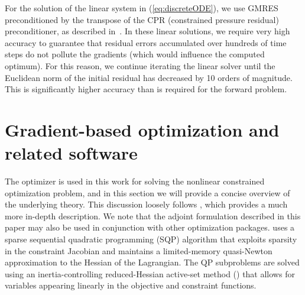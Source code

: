 For the solution of the linear system in (\ref{eq:discreteODE}), we use
GMRES preconditioned by the transpose of the CPR (constrained
pressure residual) preconditioner, as described in~\cite{CPRA}. In these
linear solutions, we require very high accuracy to guarantee that residual
errors accumulated over hundreds of time steps do not pollute the gradients
(which would influence the computed optimum). For this reason, we continue
iterating the linear solver until the Euclidean norm of the initial residual has
decreased by 10 orders of magnitude. This is significantly higher accuracy than
is required for the forward problem.




\section{Gradient-based optimization and related software}
\label{sec:SQPSNOPT}

The \SNOPT{} optimizer is used in this work for solving the nonlinear constrained
optimization problem, and in this section we will provide a concise overview of the underlying theory. This discussion loosely follows \cite{SNOPT}, which provides a much more in-depth description. We note that the adjoint formulation described in this paper may also be used in conjunction with other optimization packages. \SNOPT{} uses a sparse sequential quadratic
programming (SQP) algorithm that exploits sparsity in
the constraint Jacobian and maintains a limited-memory quasi-Newton
approximation to the Hessian of the Lagrangian. The QP
subproblems are solved using an inertia-controlling reduced-Hessian
active-set method (\SQOPT) that allows for variables appearing
linearly in the objective and constraint functions. 
 



%

